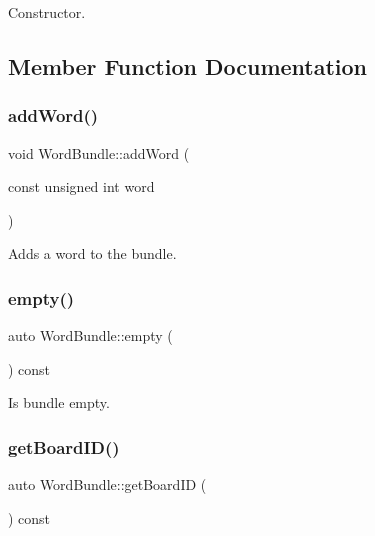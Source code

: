 Constructor. 



\subsection{Member Function Documentation}
\mbox{\label{class_word_bundle_a167d2b6b4f504e4347191a8e5bb47e5e}} 
\subsubsection{\texorpdfstring{add\+Word()}{addWord()}}
{\footnotesize\ttfamily void Word\+Bundle\+::add\+Word (\begin{DoxyParamCaption}\item[{const unsigned int}]{word }\end{DoxyParamCaption})\hspace{0.3cm}{\ttfamily [inline]}}



Adds a word to the bundle. 

\mbox{\label{class_word_bundle_ab46858414d852c8d4079c4f611f4c96c}} 
\subsubsection{\texorpdfstring{empty()}{empty()}}
{\footnotesize\ttfamily auto Word\+Bundle\+::empty (\begin{DoxyParamCaption}{ }\end{DoxyParamCaption}) const\hspace{0.3cm}{\ttfamily [inline]}}



Is bundle empty. 

\mbox{\label{class_word_bundle_afa38c6a44582d1113b9d492bb72dc9ef}} 
\subsubsection{\texorpdfstring{get\+Board\+I\+D()}{getBoardID()}}
{\footnotesize\ttfamily auto Word\+Bundle\+::get\+Board\+ID (\begin{DoxyParamCaption}{ }\end{DoxyParamCaption}) const\hspace{0.3cm}{\ttfamily [inline]}}



